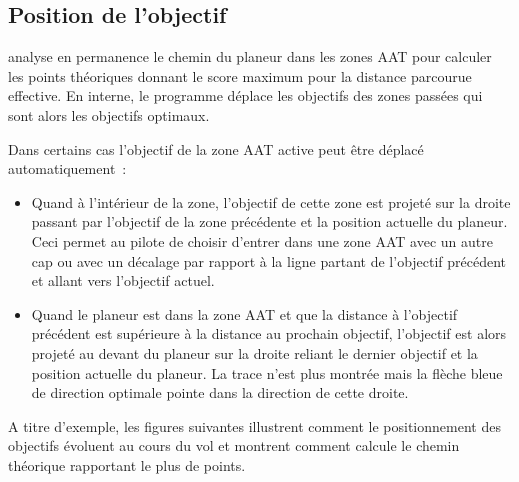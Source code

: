 \subsection*{Position de l'objectif}

\xc{} analyse en permanence le chemin du planeur dans les zones AAT pour calculer les points théoriques donnant le score maximum pour la distance parcourue effective. En interne, le programme déplace les objectifs des zones passées qui sont alors les objectifs optimaux. 

Dans certains cas l'objectif de la zone AAT active peut être déplacé automatiquement~:
\begin{itemize}
\item Quand à l'intérieur de la zone, l'objectif de cette zone est projeté sur la droite passant par l'objectif de la zone précédente et la position actuelle du planeur. Ceci permet au pilote de choisir d'entrer dans une zone AAT avec un autre cap ou avec un décalage par rapport à la ligne partant de l'objectif précédent et allant vers l'objectif actuel.

\item Quand le planeur est dans la zone AAT et que la distance à l'objectif précédent est supérieure à la distance au prochain objectif, l'objectif est alors projeté au devant du planeur sur la droite reliant le dernier objectif et la position actuelle du planeur. La trace n'est plus montrée mais la flèche bleue de direction optimale pointe dans la direction de cette droite.
\end{itemize}

A titre d'exemple, les figures suivantes illustrent comment le positionnement des objectifs évoluent au cours du vol et montrent comment \xc{} calcule le chemin théorique rapportant le plus de points.

